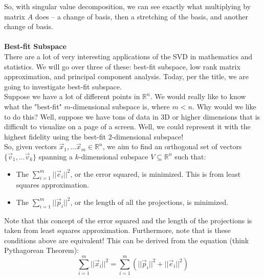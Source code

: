 \documentclass[12pt]{amsart}
\begin{document}
So, with singular value decomposition, we can see exactly what multiplying by matrix $A$ does -- a change of basis, then a stretching of the basis, and another change of basis.
\\
\\
\textbf{Best-fit Subspace}\\
There are a lot of very interesting applications of the SVD in mathematics and statistics. We will go over three of these: best-fit subspace, low rank matrix approximation, and principal component analysis. Today, per the title, we are going to investigate best-fit subspace.\\
Suppose we have a lot of different points in $\mathbb{R}^n$. We would really like to know what the "best-fit" $m$-dimensional subspace is, where $m < n$. Why would we like to do this? Well, suppose we have tons of data in 3D or higher dimensions that is difficult to visualize on a page of a screen. Well, we could represent it with the highest fidelity using the best-fit $2$-dimensional subspace!\\
So, given vectors $\vec{x}_1, \dots \vec{x}_m \in \mathbb{R}^n$, we aim to find an orthogonal set of vectors $\{\vec{v}_1, \dots \vec{v}_k\}$ spanning a $k$-dimensional subspace $V \subseteq \mathbb{R}^n$ such that:
\begin{itemize}
	\item The $\sum_{i=1}^m ||\vec{e}_i||^2$, or the error squared, is minimized. This is from least squares approximation.
	\item The $\sum_{i=1}^m ||\vec{p}_i||^2$, or the length of all the projections, is minimized. 
\end{itemize}
Note that this concept of the error squared and the length of the projections is taken from least squares approximation. Furthermore, note that is these conditions above are equivalent! This can be derived from the equation (think Pythagorean Theorem):
\[\sum_{i=1}^m ||\vec{x}_i||^2 = \sum_{i=1}^m \left(||\vec{p}_i||^2+||\vec{e}_i||^2\right)
\]
\\
\end{document}
